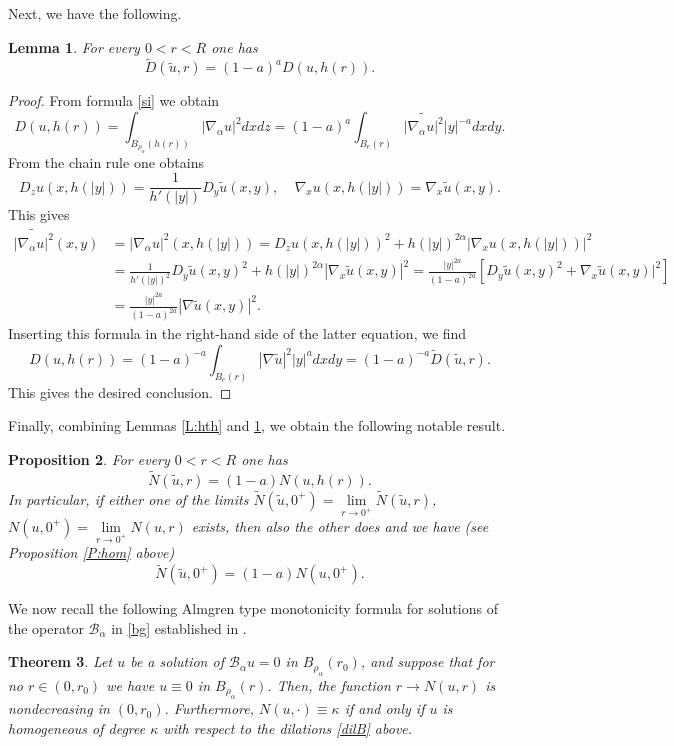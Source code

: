 \documentclass[11pt]{amsart}
\theoremstyle{plain}
\newtheorem{thrm}{Theorem}[section]
\newtheorem{lemma}[thrm]{Lemma}
\newtheorem{prop}[thrm]{Proposition}
\numberwithin{equation}{section}
\begin{document}
Next, we have the following.

\begin{lemma}\label{L:dtd}
For every $0<r<R$ one has
\[
\tilde D(\tilde u,r) = (1-a)^{a}  D(u,h(r)).
\]
\end{lemma}

\begin{proof}
From formula \eqref{si} we obtain
\[
D(u,h(r)) = \int_{B_{\rho_\alpha}(h(r))} |{\nabla_\alpha} u|^2 dx dz =  (1-a)^a \int_{B_e(r)} \widetilde{|{\nabla_\alpha} u|^2} |y|^{-a} dx dy.
\]
From the chain rule one obtains
\[
D_z u(x,h(|y|)) = \frac{1}{h'(|y|)} D_y \tilde u(x,y),\ \ \ \ \ \nabla_x u(x,h(|y|)) = \nabla_x \tilde u(x,y).
\]
This gives
\begin{align*}
\widetilde{|{\nabla_\alpha} u|^2}(x,y) & = |{\nabla_\alpha} u|^2(x,h(|y|)) = D_z u(x,h(|y|))^2 + h(|y|)^{2\alpha} |\nabla_x u(x,h(|y|))|^2
\\
& =  \frac{1}{h'(|y|)^2} D_y \tilde u(x,y)^2 + h(|y|)^{2\alpha} |\nabla_x \tilde u(x,y)|^2 = \frac{|y|^{2a}}{(1-a)^{2a}} \left[D_y \tilde u(x,y)^2 + \nabla_x \tilde u(x,y)|^2\right]
\\
& = \frac{|y|^{2a}}{(1-a)^{2a}} |\nabla \tilde u(x,y)|^2.
\end{align*}
Inserting this formula in the right-hand side of the latter equation, we find
\[
D(u,h(r)) = (1-a)^{-a} \int_{B_e(r)} |\nabla \tilde u|^2 |y|^{a} dx dy = (1-a)^{-a} \tilde D(\tilde u,r).
\]
This gives the desired conclusion.

\end{proof}

Finally, combining Lemmas \ref{L:hth} and \ref{L:dtd}, we obtain the following notable result.

\begin{prop}\label{P:ntn}
For every $0<r<R$ one has
\[
\tilde N(\tilde u,r) = (1-a) N(u,h(r)).
\]
In particular, if either one of the limits $\tilde N(\tilde u,0^+) = \underset{r\to 0^+}{\lim} \tilde N(\tilde u,r)$, $N(u,0^+) = \underset{r\to 0^+}{\lim} N(u,r)$ exists, then also the other does and we have (see Proposition \ref{P:hom} above)
\[
\tilde N(\tilde u,0^+) = (1-a)  N(u,0^+).
\]
\end{prop}

We now recall the following Almgren type monotonicity formula for solutions of the operator ${\mathcal{B}_\alpha}$ in \eqref{bg} established in \cite{G}.

\begin{thrm}\label{T:almgrenBa}
Let $u$ be a solution of ${\mathcal{B}_\alpha} u = 0$ in $B_{\rho_\alpha}(r_0)$, and suppose that for no $r\in (0,r_0)$ we have $u\equiv 0$ in $B_{\rho_\alpha}(r)$. Then, the function $r\to N(u,r)$ is nondecreasing in $(0,r_0)$. Furthermore, $N(u,\cdot)\equiv \kappa$ if and only if $u$ is homogeneous of degree $\kappa$ with respect to the dilations \eqref{dilB} above.
\end{thrm}
\end{document}
